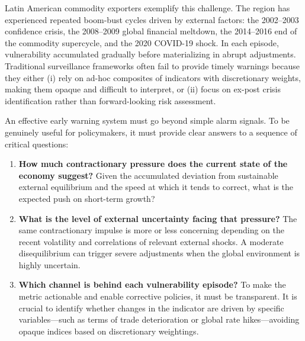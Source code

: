 \documentclass[12pt,a4paper]{article}
\numberwithin{equation}{section}
\theoremstyle{definition}
\theoremstyle{remark}
\begin{document}
Latin American commodity exporters exemplify this challenge. The region has experienced repeated boom-bust cycles driven by external factors: the 2002--2003 confidence crisis, the 2008--2009 global financial meltdown, the 2014--2016 end of the commodity supercycle, and the 2020 COVID-19 shock. In each episode, vulnerability accumulated gradually before materializing in abrupt adjustments. Traditional surveillance frameworks often fail to provide timely warnings because they either (i) rely on ad-hoc composites of indicators with discretionary weights, making them opaque and difficult to interpret, or (ii) focus on ex-post crisis identification rather than forward-looking risk assessment.

An effective early warning system must go beyond simple alarm signals. To be genuinely useful for policymakers, it must provide clear answers to a sequence of critical questions:

\begin{enumerate}[nosep]
\item \textbf{How much contractionary pressure does the current state of the economy suggest?} Given the accumulated deviation from sustainable external equilibrium and the speed at which it tends to correct, what is the expected push on short-term growth?

\item \textbf{What is the level of external uncertainty facing that pressure?} The same contractionary impulse is more or less concerning depending on the recent volatility and correlations of relevant external shocks. A moderate disequilibrium can trigger severe adjustments when the global environment is highly uncertain.

\item \textbf{Which channel is behind each vulnerability episode?} To make the metric actionable and enable corrective policies, it must be transparent. It is crucial to identify whether changes in the indicator are driven by specific variables---such as terms of trade deterioration or global rate hikes---avoiding opaque indices based on discretionary weightings.
\end{enumerate}
\end{document}
